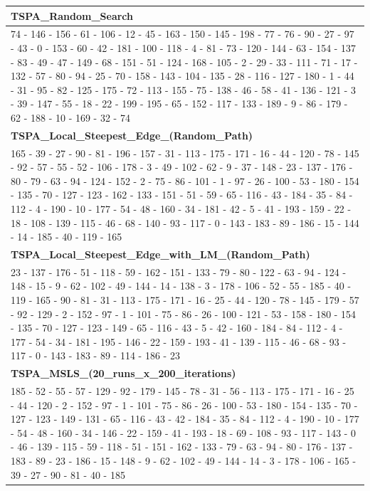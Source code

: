 \begin{table}[h!]
\centering
\begin{tabular}{|p{14cm}|}
\hline
\textbf{TSPA\_Random\_Search} \\ \hline
74 - 146 - 156 - 61 - 106 - 12 - 45 - 163 - 150 - 145 - 198 - 77 - 76 - 90 - 27 - 97 - 43 - 0 - 153 - 60 - 42 - 181 - 100 - 118 - 4 - 81 - 73 - 120 - 144 - 63 - 154 - 137 - 83 - 49 - 47 - 149 - 68 - 151 - 51 - 124 - 168 - 105 - 2 - 29 - 33 - 111 - 71 - 17 - 132 - 57 - 80 - 94 - 25 - 70 - 158 - 143 - 104 - 135 - 28 - 116 - 127 - 180 - 1 - 44 - 31 - 95 - 82 - 125 - 175 - 72 - 113 - 155 - 75 - 138 - 46 - 58 - 41 - 136 - 121 - 3 - 39 - 147 - 55 - 18 - 22 - 199 - 195 - 65 - 152 - 117 - 133 - 189 - 9 - 86 - 179 - 62 - 188 - 10 - 169 - 32 - 74 \\ \hline
\textbf{TSPA\_Local\_Steepest\_Edge\_(Random\_Path)} \\ \hline
165 - 39 - 27 - 90 - 81 - 196 - 157 - 31 - 113 - 175 - 171 - 16 - 44 - 120 - 78 - 145 - 92 - 57 - 55 - 52 - 106 - 178 - 3 - 49 - 102 - 62 - 9 - 37 - 148 - 23 - 137 - 176 - 80 - 79 - 63 - 94 - 124 - 152 - 2 - 75 - 86 - 101 - 1 - 97 - 26 - 100 - 53 - 180 - 154 - 135 - 70 - 127 - 123 - 162 - 133 - 151 - 51 - 59 - 65 - 116 - 43 - 184 - 35 - 84 - 112 - 4 - 190 - 10 - 177 - 54 - 48 - 160 - 34 - 181 - 42 - 5 - 41 - 193 - 159 - 22 - 18 - 108 - 139 - 115 - 46 - 68 - 140 - 93 - 117 - 0 - 143 - 183 - 89 - 186 - 15 - 144 - 14 - 185 - 40 - 119 - 165 \\ \hline
\textbf{TSPA\_Local\_Steepest\_Edge\_with\_LM\_(Random\_Path)} \\ \hline
23 - 137 - 176 - 51 - 118 - 59 - 162 - 151 - 133 - 79 - 80 - 122 - 63 - 94 - 124 - 148 - 15 - 9 - 62 - 102 - 49 - 144 - 14 - 138 - 3 - 178 - 106 - 52 - 55 - 185 - 40 - 119 - 165 - 90 - 81 - 31 - 113 - 175 - 171 - 16 - 25 - 44 - 120 - 78 - 145 - 179 - 57 - 92 - 129 - 2 - 152 - 97 - 1 - 101 - 75 - 86 - 26 - 100 - 121 - 53 - 158 - 180 - 154 - 135 - 70 - 127 - 123 - 149 - 65 - 116 - 43 - 5 - 42 - 160 - 184 - 84 - 112 - 4 - 177 - 54 - 34 - 181 - 195 - 146 - 22 - 159 - 193 - 41 - 139 - 115 - 46 - 68 - 93 - 117 - 0 - 143 - 183 - 89 - 114 - 186 - 23 \\ \hline
\textbf{TSPA\_MSLS\_(20\_runs\_x\_200\_iterations)} \\ \hline
185 - 52 - 55 - 57 - 129 - 92 - 179 - 145 - 78 - 31 - 56 - 113 - 175 - 171 - 16 - 25 - 44 - 120 - 2 - 152 - 97 - 1 - 101 - 75 - 86 - 26 - 100 - 53 - 180 - 154 - 135 - 70 - 127 - 123 - 149 - 131 - 65 - 116 - 43 - 42 - 184 - 35 - 84 - 112 - 4 - 190 - 10 - 177 - 54 - 48 - 160 - 34 - 146 - 22 - 159 - 41 - 193 - 18 - 69 - 108 - 93 - 117 - 143 - 0 - 46 - 139 - 115 - 59 - 118 - 51 - 151 - 162 - 133 - 79 - 63 - 94 - 80 - 176 - 137 - 183 - 89 - 23 - 186 - 15 - 148 - 9 - 62 - 102 - 49 - 144 - 14 - 3 - 178 - 106 - 165 - 39 - 27 - 90 - 81 - 40 - 185 \\ \hline

\end{tabular}
\end{table}

